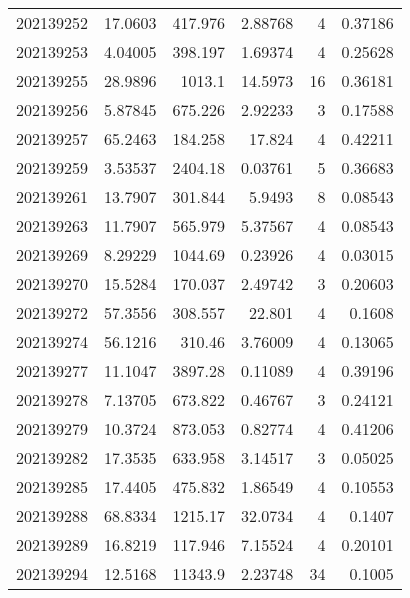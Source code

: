 \begin{tabular}{rrrrrr}
 202139252 &         17.0603  &      417.976  &            2.88768 &           4 & 0.37186 \\
 202139253 &          4.04005 &      398.197  &            1.69374 &           4 & 0.25628 \\
 202139255 &         28.9896  &     1013.1    &           14.5973  &          16 & 0.36181 \\
 202139256 &          5.87845 &      675.226  &            2.92233 &           3 & 0.17588 \\
 202139257 &         65.2463  &      184.258  &           17.824   &           4 & 0.42211 \\
 202139259 &          3.53537 &     2404.18   &            0.03761 &           5 & 0.36683 \\
 202139261 &         13.7907  &      301.844  &            5.9493  &           8 & 0.08543 \\
 202139263 &         11.7907  &      565.979  &            5.37567 &           4 & 0.08543 \\
 202139269 &          8.29229 &     1044.69   &            0.23926 &           4 & 0.03015 \\
 202139270 &         15.5284  &      170.037  &            2.49742 &           3 & 0.20603 \\
 202139272 &         57.3556  &      308.557  &           22.801   &           4 & 0.1608  \\
 202139274 &         56.1216  &      310.46   &            3.76009 &           4 & 0.13065 \\
 202139277 &         11.1047  &     3897.28   &            0.11089 &           4 & 0.39196 \\
 202139278 &          7.13705 &      673.822  &            0.46767 &           3 & 0.24121 \\
 202139279 &         10.3724  &      873.053  &            0.82774 &           4 & 0.41206 \\
 202139282 &         17.3535  &      633.958  &            3.14517 &           3 & 0.05025 \\
 202139285 &         17.4405  &      475.832  &            1.86549 &           4 & 0.10553 \\
 202139288 &         68.8334  &     1215.17   &           32.0734  &           4 & 0.1407  \\
 202139289 &         16.8219  &      117.946  &            7.15524 &           4 & 0.20101 \\
 202139294 &         12.5168  &    11343.9    &            2.23748 &          34 & 0.1005  \\

\end{tabular}
